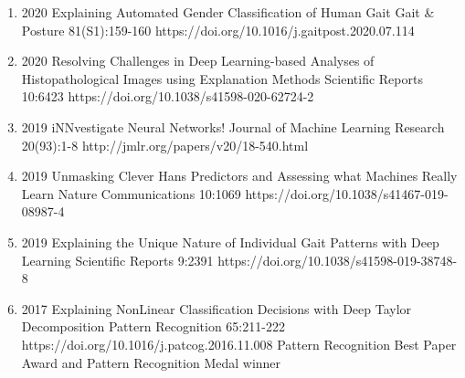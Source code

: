 \documentclass[10pt,a4paper]{article} %
\begin{document}
{\begin{enumerate}
    \item[] 
                        {2020}
                        {Explaining Automated Gender Classification of Human Gait}
                        {Gait \& Posture}
                        {81(S1):159-160}
                        {https://doi.org/10.1016/j.gaitpost.2020.07.114}

    \item[] 
                        {2020}
                        {Resolving Challenges in Deep Learning-based Analyses of Histopathological Images using Explanation Methods}
                        {Scientific Reports}
                        {10:6423}
                        {https://doi.org/10.1038/s41598-020-62724-2}

    \item[] 
                        {2019}
                        {iNNvestigate Neural Networks!}
                        {Journal of Machine Learning Research}
                        {20(93):1-8}
                        {http://jmlr.org/papers/v20/18-540.html}

    \item[] 
                        {2019}
                        {Unmasking Clever Hans Predictors and Assessing what Machines Really Learn}
                        {Nature Communications}
                        {10:1069}
                        {https://doi.org/10.1038/s41467-019-08987-4}

    \item[] 
                        {2019}
                        {Explaining the Unique Nature of Individual Gait Patterns with Deep Learning}
                        {Scientific Reports}
                        {9:2391}
                        {https://doi.org/10.1038/s41598-019-38748-8}

    \item[] 
                            {2017}
                            {Explaining NonLinear Classification Decisions with Deep Taylor Decomposition}
                            {Pattern Recognition}
                            {65:211-222}
                            {https://doi.org/10.1016/j.patcog.2016.11.008}
                            {Pattern Recognition Best Paper Award and Pattern Recognition Medal winner}


\end{enumerate}}
\end{document}
